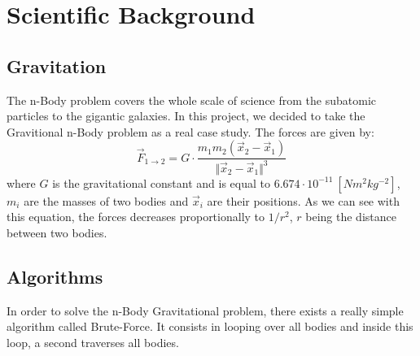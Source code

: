 \documentclass[10pt,a4paper]{article}
\begin{document}



\section{Scientific Background}

\subsection{Gravitation} 

The n-Body problem covers the whole scale of science from the subatomic particles to the gigantic galaxies. In this project, we decided to take the Gravitional n-Body problem as a real case study. The forces\cite{grav} are given by:
\begin{equation}
\vec{F}_{1\rightarrow 2} = G\cdot\frac{m_1m_2(\vec{x}_2-\vec{x}_1)}{\Vert \vec{x}_2-\vec{x}_1\Vert^3}
\end{equation}
where $G$ is the gravitational constant and is equal to $6.674 \cdot 10^{-11}~[Nm^2kg^{-2}]$, $m_i$ are the masses of two bodies and $\vec{x}_i$ are their positions. As we can see with this equation, the forces decreases proportionally to $1/r^2$, $r$ being the distance between two bodies. 

\subsection{Algorithms}

In order to solve the n-Body Gravitational problem, there exists a really simple algorithm called Brute-Force. It consists in looping over all bodies and inside this loop, a second traverses all bodies.
\end{document}
